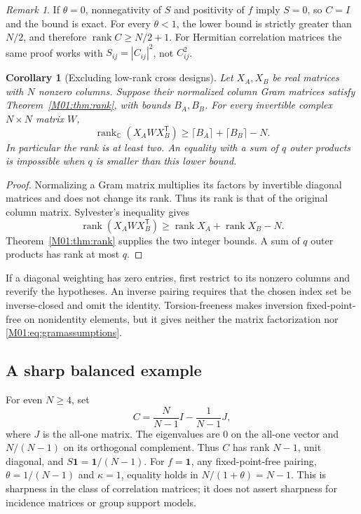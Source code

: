\documentclass[11pt,a4paper,oneside]{report}
\newtheorem{corollary}[theorem]{Corollary}
\theoremstyle{definition}
\theoremstyle{remark}
\newtheorem{remark}[theorem]{Remark}
\DeclareMathOperator{\rank}{rank}
\newcommand{\C}{\mathbb C}
\begin{document}
\begin{remark}
If $\theta=0$, nonnegativity of $S$ and positivity of $f$ imply $S=0$,
so $C=I$ and the bound is exact. For every $\theta<1$, the lower bound
is strictly greater than $N/2$, and therefore $\rank C\ge N/2+1$.
For Hermitian correlation matrices the same proof works with
$S_{ij}=|C_{ij}|^2$, not $C_{ij}^2$.
\end{remark}

\begin{corollary}[Excluding low-rank cross designs]\label{M01:cor:crossrank}
Let $X_A,X_B$ be real matrices with $N$ nonzero columns. Suppose their
normalized column Gram matrices satisfy Theorem~\ref{M01:thm:rank}, with
bounds $B_A,B_B$. For every invertible complex $N\times N$ matrix $W$,
\[
\rank_{\C}(X_AWX_B^{\mathsf T})
\ge \lceil B_A\rceil+\lceil B_B\rceil-N.
\]
In particular the rank is at least two. An equality with a sum of $q$
outer products is impossible when $q$ is smaller than this lower bound.
\end{corollary}
\begin{proof}
Normalizing a Gram matrix multiplies its factors by invertible diagonal
matrices and does not change its rank. Thus its rank is that of the
original column matrix. Sylvester's inequality gives
\[
\rank(X_AWX_B^{\mathsf T})\ge\rank X_A+\rank X_B-N.
\]
Theorem~\ref{M01:thm:rank} supplies the two integer bounds. A sum of $q$
outer products has rank at most $q$.
\end{proof}

If a diagonal weighting has zero entries, first restrict to its nonzero
columns and reverify the hypotheses. An inverse pairing requires that
the chosen index set be inverse-closed and omit the identity.
Torsion-freeness makes inversion fixed-point-free on nonidentity
elements, but it gives neither the matrix factorization nor
\eqref{M01:eq:gramassumptions}.

\subsection{A sharp balanced example}

For even $N\ge4$, set
\[
C=\frac{N}{N-1}I-\frac1{N-1}J,
\]
where $J$ is the all-one matrix. The eigenvalues are $0$ on the
all-one vector and $N/(N-1)$ on its orthogonal complement. Thus $C$
has rank $N-1$, unit diagonal, and
$S\mathbf1=\mathbf1/(N-1)$. For $f=\mathbf1$, any fixed-point-free
pairing, $\theta=1/(N-1)$ and $\kappa=1$, equality holds in
$N/(1+\theta)=N-1$. This is sharpness in the class of correlation
matrices; it does not assert sharpness for incidence matrices or group
support models.
\end{document}

